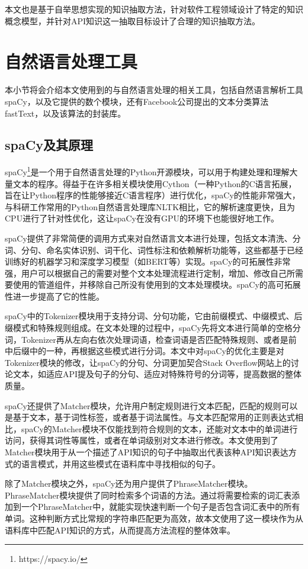 本文也是基于自举思想实现的知识抽取方法，针对软件工程领域设计了特定的知识概念模型，并针对API知识这一抽取目标设计了合理的知识抽取方法。

\section{自然语言处理工具}
本小节将会介绍本文使用到的与自然语言处理的相关工具，包括自然语言解析工具spaCy，以及它提供的数个模块，还有Facebook公司提出的文本分类算法fastText，以及该算法的封装库。
\subsection{spaCy及其原理}
spaCy\footnote{https://spacy.io/}是一个用于自然语言处理的Python开源模块，可以用于构建处理和理解大量文本的程序。得益于在许多相关模块使用Cython（一种Python的C语言拓展，旨在让Python程序的性能够接近C语言程序）进行优化，spaCy的性能非常强大，与科研工作常用的Python自然语言处理库NLTK相比，它的解析速度更快，且为CPU进行了针对性优化，这让spaCy在没有GPU的环境下也能很好地工作。

spaCy提供了非常简便的调用方式来对自然语言文本进行处理，包括文本清洗、分词、分句、命名实体识别、词干化、词性标注和依赖解析功能等，这些都基于已经训练好的机器学习和深度学习模型（如BERT等）实现。spaCy的可拓展性非常强，用户可以根据自己的需要对整个文本处理流程进行定制，增加、修改自己所需要使用的管道组件，并移除自己所没有使用到的文本处理模块。spaCy的高可拓展性进一步提高了它的性能。

spaCy中的Tokenizer模块用于支持分词、分句功能，它由前缀模式、中缀模式、后缀模式和特殊规则组成。在文本处理的过程中，spaCy先将文本进行简单的空格分词，Tokenizer再从左向右依次处理词语，检查词语是否匹配特殊规则、或者是前中后缀中的一种，再根据这些模式进行分词。本文中对spaCy的优化主要是对Tokenizer模块的修改，让spaCy的分句、分词更加契合Stack Overflow网站上的讨论文本，如适应API提及句子的分句、适应对特殊符号的分词等，提高数据的整体质量。

spaCy还提供了Matcher模块，允许用户制定规则进行文本匹配，匹配的规则可以是基于文本，基于词性标签，或者基于词法属性。与文本匹配常用的正则表达式相比，spaCy的Matcher模块不仅能找到符合规则的文本，还能对文本中的单词进行访问，获得其词性等属性，或者在单词级别对文本进行修改。本文使用到了Matcher模块用于从一个描述了API知识的句子中抽取出代表该种API知识表达方式的语言模式，并用这些模式在语料库中寻找相似的句子。

除了Matcher模块之外，spaCy还为用户提供了PhraseMatcher模块。PhraseMatcher模块提供了同时检索多个词语的方法。通过将需要检索的词汇表添加到一个PhraseMatcher中，就能实现快速判断一个句子是否包含词汇表中的所有单词。这种判断方式比常规的字符串匹配更为高效，故本文使用了这一模块作为从语料库中匹配API知识的方式，从而提高方法流程的整体效率。

